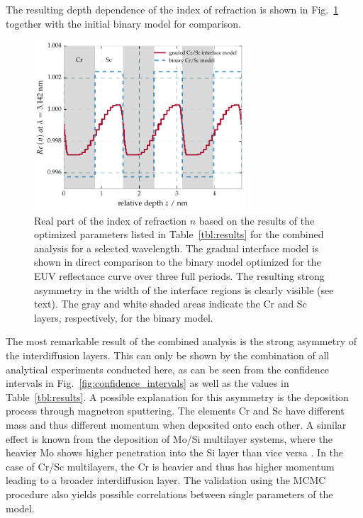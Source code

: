 The resulting depth dependence of the index of refraction is shown in 
Fig.~\ref{fig:electron_density_profile} together with the initial binary model 
for comparison.
\begin{figure}[htbp]
  \centering
  \includegraphics[width=0.7\textwidth]{img/CrSc_binary_vs_fitted_gradual_model}
  \caption{Real part of the index of refraction $n$  based on the results of 
the optimized parameters listed in Table~\ref{tbl:results} for the combined 
analysis for a selected wavelength. The gradual interface model is shown in 
direct comparison to the binary model optimized for the EUV reflectance curve 
over three full periods. The resulting strong asymmetry in the width of the 
interface regions is clearly visible (see text). The gray and white shaded 
areas indicate the Cr and Sc layers, respectively, for the binary model.}
  \label{fig:electron_density_profile}
\end{figure}
The most remarkable result of the combined analysis is the strong asymmetry of 
the interdiffusion layers. This can only be shown by the combination of all 
analytical experiments conducted here, as can be seen from the confidence 
intervals in Fig.~\ref{fig:confidence_intervals} as well as the values in 
Table~\ref{tbl:results}. A possible explanation for this asymmetry is the 
deposition process through magnetron sputtering. The elements Cr and Sc have 
different mass and thus different momentum when deposited onto each other. A 
similar effect is known from the deposition of Mo/Si multilayer systems, where 
the heavier Mo shows higher penetration into the Si layer than vice versa 
\cite{petford-long_highresolution_1987}. In the case of Cr/Sc multilayers, the Cr is heavier and 
thus has higher momentum leading to a broader interdiffusion layer.
The validation using the MCMC procedure also yields possible correlations 
between single parameters of the model.

\cite{haase_multiparameter_2016}


